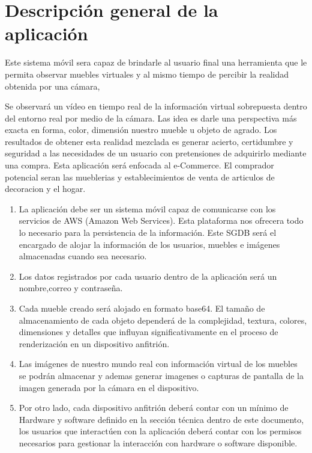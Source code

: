 \section{Descripción general de la aplicación}
Este sistema móvil sera capaz de  brindarle al usuario final una herramienta que le permita observar muebles virtuales y al mismo tiempo de percibir la realidad obtenida por una cámara,\par
\vspace{5mm}
Se observará un vídeo en tiempo real de la información virtual sobrepuesta dentro del entorno real por medio de la cámara. Las idea es darle una perspectiva más exacta en forma, color, dimensión nuestro mueble u objeto de agrado. Los resultados de obtener esta realidad mezclada es generar acierto, certidumbre y seguridad a las necesidades de un usuario con pretensiones de adquirirlo mediante una compra. Esta aplicación será enfocada al e-Commerce. El comprador potencial seran las mueblerias y establecimientos de venta de articulos de decoracion y el hogar.\par
\vspace{5mm}
\begin{enumerate}[1.]
	\item La aplicación debe ser un sistema móvil capaz de comunicarse con los servicios de AWS (Amazon Web Services). Esta plataforma nos ofrecera todo lo necesario para la persistencia de la información. Este SGDB será el encargado de alojar la información de los usuarios, muebles e imágenes almacenadas cuando sea necesario. 
	\item Los datos registrados por cada usuario dentro de la aplicación será un nombre,correo y contraseña.\par
	\item Cada mueble creado será alojado en formato base64. El tamaño de almacenamiento de cada objeto dependerá de la complejidad, textura, colores, dimensiones y detalles que influyan significativamente en el proceso de renderización en un dispositivo anfitrión.\par
	\item Las imágenes de nuestro mundo real con información virtual de los muebles se podrán almacenar y ademas generar imagenes o capturas de pantalla de la imagen generada por la cámara en el dispositivo.\par
	\item Por otro lado, cada dispositivo anfitrión deberá contar con un mínimo de Hardware y software definido en la sección técnica dentro de este documento, los usuarios que interactúen con la aplicación  deberá contar con los permisos necesarios para  gestionar  la interacción con hardware o software disponible.\par	
\end{enumerate}
